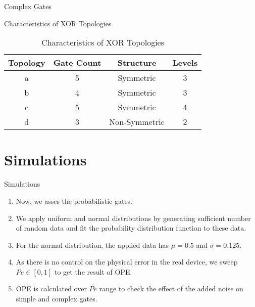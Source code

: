 \documentclass{beamer}
\begin{document}
\begin{frame}{Complex Gates}
    \begin{block}{Characteristics of XOR Topologies}
    \begin{table}[]
        \centering
\renewcommand{\arraystretch}{1.4}
        \begin{tabular}{|c|c|c|c|}
        \hline
             Topology& Gate Count& Structure& Levels \\ \hline
             a& 5& Symmetric& 3\\ \hline
             b& 4& Symmetric& 3\\ \hline
             c& 5& Symmetric& 4\\ \hline
             d& 3& Non-Symmetric& 2\\\hline
        \end{tabular}
        \caption{Characteristics of XOR Topologies}
        \label{tab:my_label}
    \end{table}
    \end{block}
\end{frame}

\section{Simulations}
\begin{frame}{Simulations}
    \begin{enumerate}
        \item Now, we asses the probabilistic gates.
        \item We apply uniform and normal distributions by generating sufficient number of random data and fit the probability distribution function to these data.
        \item For the normal distribution, the applied data has $\mu = 0.5$ and $\sigma = 0.125$.
        \item As there is no control on the physical error in the real device, we sweep $Pe \in [0,1]$ to get the result of OPE.
        \item OPE is calculated over $Pe$ range to check the effect of the added noise on simple and complex gates.
    \end{enumerate}
\end{frame}
\end{document}
